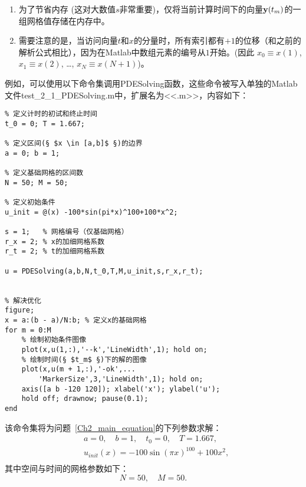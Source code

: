 \documentclass[twoside]{book}
\def\textbf{\bf}%
\begin{document}
\begin{CJK*}{GBK}{song}
\begin{enumerate}
    \item 为了节省内存 (这对大数值$s$非常重要)，仅将当前计算时间下的向量$\emph{\textbf{y}}(t_m)$的一组网格值存储在内存中。

    \item 需要注意的是，当访问向量$t$和$x$的分量时，所有索引都有$+1$的位移（和之前的解析公式相比），因为在Matlab中数组元素的编号从$1$开始。(因此 $x_0 \equiv x(1)$, $x_1 \equiv x(2)$, \ldots, $x_N \equiv x(N + 1)$)。
\end{enumerate}



例如，可以使用以下命令集调用PDESolving函数，这些命令被写入单独的Matlab文件test\_2\_1\_PDESolving.m中，扩展名为<<.m>>，内容如下：
%
\begin{lstlisting}
% 定义计时的初试和终止时间
t_0 = 0; T = 1.667;

% 定义区间(§ $x \in [a,b]$ §)的边界
a = 0; b = 1;

% 定义基础网格的区间数
N = 50; M = 50;

% 定义初始条件
u_init = @(x) -100*sin(pi*x)^100+100*x^2;

s = 1;   % 网格编号（仅基础网格）
r_x = 2; % x的加细网格系数
r_t = 2; % t的加细网格系数

u = PDESolving(a,b,N,t_0,T,M,u_init,s,r_x,r_t);


% 解决优化
figure;
x = a:(b - a)/N:b; % 定义x的基础网格
for m = 0:M
    % 绘制初始条件图像
    plot(x,u(1,:),'--k','LineWidth',1); hold on;
    % 绘制时间(§ $t_m$ §)下的解的图像
    plot(x,u(m + 1,:),'-ok',...
        'MarkerSize',3,'LineWidth',1); hold on;
    axis([a b -120 120]); xlabel('x'); ylabel('u');
    hold off; drawnow; pause(0.1);
end
\end{lstlisting}

该命令集将为问题~\eqref{Ch2_main_equation}的下列参数求解：
\begin{equation}
    \label{Ch_2_parameters_2_a}
    \begin{aligned}
        &a = 0, \quad b = 1, \quad t_0 = 0, \quad T = 1.667, \\
        &u_{init}(x) = -100\sin(\pi x)^{100} + 100 x^2, \\
    \end{aligned}
\end{equation}
其中空间与时间的网格参数如下：
\begin{equation}
    \label{Ch_2_parameters_2_b}
    N = 50, \quad M = 50.
\end{equation}


\end{CJK*}
\end{document}
